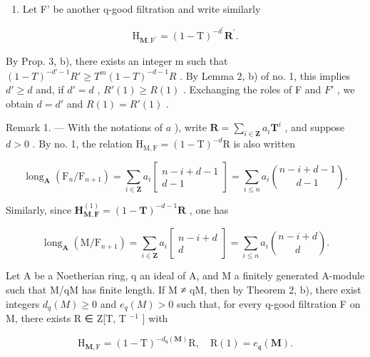 \begin{enumerate}
\def\labelenumi{\alph{enumi})}
\setcounter{enumi}{1}
\tightlist
\item
  Let F' be another q-good filtration and write similarly
\end{enumerate}

\[
\mathrm{H} _ {\mathbf {M}, \mathrm{F} ^ {\prime}} = (1 - \mathrm{T}) ^ {- d ^ {\prime}} \mathbf {R} ^ {\prime}.
\]

By Prop. 3, b), there exists an integer m such that \((1 - T)^{-d'-1}R' \geqslant T^{m}(1 - T)^{-d-1}R\) . By Lemma 2, b) of no. 1, this implies \(d' \geqslant d\) and, if \(d' = d\) , \(R'(1) \geqslant R(1)\) . Exchanging the roles of F and \(F'\) , we obtain \(d = d'\) and \(R(1) = R'(1)\) .

Remark 1. --- With the notations of \(a\) ), write \(\mathbf{R} = \sum_{i \in \mathbf{Z}} a_i \mathbf{T}^i\) , and suppose \(d > 0\) . By no. 1, the relation \(\mathrm{H}_{\mathrm{M},\mathrm{F}} = (1 - \mathrm{T})^{-d}\mathrm{R}\) is also written

\[
\operatorname{long} _ {\mathbf {A}} \left(\mathrm{F} _ {n} / \mathrm{F} _ {n + 1}\right) = \sum_ {i \in \mathbf {Z}} a _ {i} \left[ \begin{array}{c} n - i + d - 1 \\ d - 1 \end{array} \right] = \sum_ {i \leqslant n} a _ {i} \binom {n - i + d - 1} {d - 1}.\tag{11}
\]

Similarly, since \(\mathbf{H}_{\mathbf{M},\mathbf{F}}^{(1)} = (1 - \mathbf{T})^{-d - 1}\mathbf{R}\) , one has

\[
\operatorname{long} _ {\mathbf {A}} \left(\mathrm{M} / \mathrm{F} _ {n + 1}\right) = \sum_ {i \in \mathbf {Z}} a _ {i} \left[ \begin{array}{c} n - i + d \\ d \end{array} \right] = \sum_ {i \leqslant n} a _ {i} \binom {n - i + d} {d}.\tag{12}
\]

Let A be a Noetherian ring, q an ideal of A, and M a finitely generated A-module such that M/qM has finite length. If M ≠ qM, then by Theorem 2, b), there exist integers \(d_{q}(M) \geqslant 0\) and \(e_{q}(M) > 0\) such that, for every q-good filtration F on M, there exists R ∈ Z{[}T, T \(^{-1}\) {]} with

\[
\mathrm{H} _ {\mathbf {M}, \mathrm{F}} = (1 - \mathrm{T}) ^ {- d _ {\mathfrak {q}} (\mathbf {M})} \mathrm{R}, \quad \mathrm{R} (1) = e _ {\mathfrak {q}} (\mathbf {M}).
\]

